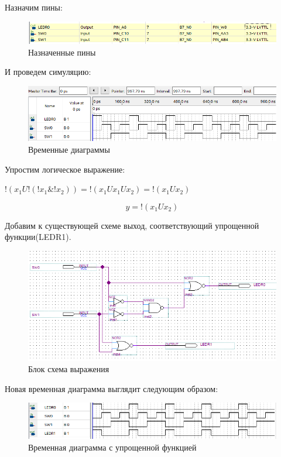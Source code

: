 \documentclass[a4paper,14pt]{article}
\begin{document}
Назначим пины:

\begin{figure}[H]
	\centering
	\includegraphics[width=0.7\linewidth]{image/01_03}
	\caption{Назначенные пины}
	\label{fig:0103}
\end{figure}

И проведем симуляцию:

\begin{figure}[H]
	\centering
	\includegraphics[width=0.7\linewidth]{image/01_04}
	\caption{Временные диаграммы}
	\label{fig:0104}
\end{figure}

Упростим логическое выражение:

$ !(x_1 U !(!x_1 \& !x_2)) = !(x_1 U x_1 U x_2) =  !(x_1 U x_2)$

$$ y =  !(x_1 U x_2)$$
 
Добавим к существующей схеме выход, соответствующий упрощенной функции(LEDR1).
 
\begin{figure}[H]
	\centering
	\includegraphics[width=0.7\linewidth]{image/01_07}
	\caption{Блок схема выражения}
	\label{fig:0107}
\end{figure}

Новая временная диаграмма выглядит следующим образом:

\begin{figure}[H]
	\centering
	\includegraphics[width=0.7\linewidth]{image/01_06}
	\caption{Временная диаграмма с упрощенной функцией}
	\label{fig:0106}
\end{figure}
\end{document}
